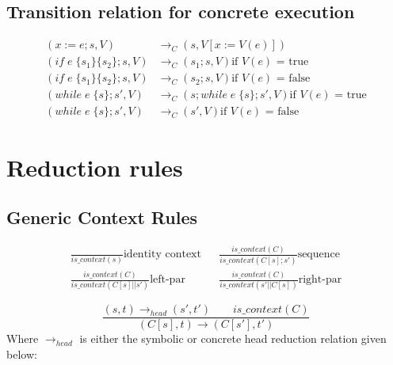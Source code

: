 \documentclass[submission,copyright,creativecommons]{eptcs}
\begin{document}
\subsection{Transition relation for concrete execution}
\begin{align*}
(x := e ; s, V) & \rightarrow_{C} (s, V[x := V(e)]) \\
(if \;e\; \{s_{1}\} \{s_{2}\} ; s, V) & \rightarrow_{C} (s_{1} ; s, V) \mbox{if $V (e)$ = true} \\
(if \;e\; \{s_{1}\} \{s_{2}\} ; s, V) & \rightarrow_{C} (s_{2} ; s, V) \mbox{if $V (e)$ = false} \\
(while \;e\; \{s\} ; s', V) & \rightarrow_{C} (s ; while \;e\; \{s\} ; s', V) \mbox{if $V (e)$ = true} \\
(while \;e\; \{s\} ; s', V) & \rightarrow_{C} (s', V) \mbox{if $V (e)$ = false}
\end{align*}
\section{Reduction rules}
\subsection{Generic Context Rules}
\begin{align*}
  \frac{}{is\_context (s)} \mbox{identity context} && \frac{is\_context (C)}{is\_context (C[s] ; s')} \mbox{sequence} \\
  \frac{is\_context (C)}{is\_context (C[s] |\!| s')} \mbox{left-par}
  && \frac{is\_context (C)}{is\_context (s' |\!| C[s])} \mbox{right-par}
\end{align*}

\[\frac{(s, t) \rightarrow_{head} (s', t') \qquad is\_context (C)}{(C[s], t) \rightarrow (C[s'], t')}\]
Where $\rightarrow_{head}$ is either the symbolic or concrete head reduction relation given below:
\end{document}
